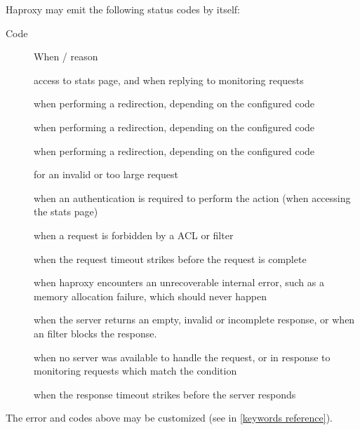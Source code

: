 Haproxy may emit the following status codes by itself:
\begin{description}
\item[Code]	When / reason
\item[]	access to stats page, and when replying to monitoring requests 
\item[]	when performing a redirection, depending on the configured code 
\item[]	when performing a redirection, depending on the configured code 
\item[]	when performing a redirection, depending on the configured code 
\item[]	for an invalid or too large request 
\item[]	when an authentication is required to perform the action 
		(when accessing the stats page) 
\item[]	when a request is forbidden by a  ACL or  filter 
\item[]	when the request timeout strikes before the request is complete 
\item[]	when haproxy encounters an unrecoverable internal error, such as 
		a memory allocation failure, which should never happen 
\item[]	when the server returns an empty, invalid or incomplete response, or
		when an  filter blocks the response.
\item[]	when no server was available to handle the request, or in response to
		monitoring requests which match the  condition 
\item[]	when the response timeout strikes before the server responds
\end{description}

The error  and  codes above may be customized
(see  in \autoref{keywords reference}).


